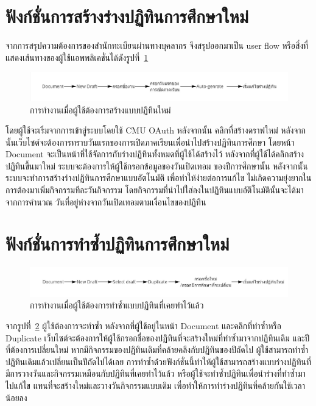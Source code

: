 
\section{ฟังก์ชั่นการสร้างร่างปฏิทินการศึกษาใหม่}
จากการสรุปความต้องการของสำนักทะเบียนผ่านทางบุคลากร จึงสรุปออกมาเป็น user flow หรือสิ่งที่แสดงเส้นทางของผู้ใช้แอพพลิเคชั่นได้ดังรูปที่~\ref{fig:user-flow-new}

%
\begin{figure}[h]
\centering
\includegraphics[width=1\textwidth]{pic3.1.jpg}
\caption{การทำงานเมื่อผู้ใช้ต้องการสร้างแบบปฏิทินใหม่}
\label{fig:user-flow-new}
\end{figure}
%
โดยผู้ใช้จะเริ่มจากการเข้าสู่ระบบโดยใช้ CMU OAuth หลังจากนั้น คลิกที่สร้างดราฟใหม่ 
หลังจากนั้นเว็บไซต์จะต้องการทราบวันแรกของการเปิดภาคเรียนเพื่อนำไปสร้างปฏิทินการศึกษา
โดยหน้า Document จะเป็นหน้าที่ใช้จัดการกับร่างปฏิทินทั้งหมดที่ผู้ใช้ได้สร้างไว้
หลังจากที่ผู้ใช้ได้คลิกสร้างปฏิทินขึ้นมาใหม่ ระบบจะต้องการให้ผู้ใช้กรอกข้อมูลของวันเปิดเทอม
ของปีการศึกษานั้น หลังจากนั้นระบบจะทำการสร้างร่างปฏิทินการศึกษาแบบอัตโนมัติ
เพื่อทำให้ง่ายต่อการแก้ไข ไม่เกิดความยุ่งยากในการต้องมาเพิ่มกิจกรรมทีละวันกิจกรรม
โดยกิจกรรมที่นำไปใส่ลงในปฏิทินแบบอัติโนมัตินั้นจะได้มาจากการคำนวณ
วันที่อยู่ห่างจากวันเปิดเทอมตามเงื่อนไขของปฏิทิน

\section{ฟังก์ชั่นการทำซ้ำปฏิทินการศึกษาใหม่}
\begin{figure}[h]
\centering
\includegraphics[width=1\textwidth]{pic3.2.jpg}
\caption{การทำงานเมื่อผู้ใช้ต้องการทำซ้ำแบบปฏิทินที่เคยทำไว้แล้ว}
\label{fig:user-flow-duplicate}
\end{figure}
จากรูปที่~\ref{fig:user-flow-duplicate} ผู้ใช้ต้องการจะทำซ้ำ หลังจากที่ผู้ใช้อยู่ในหน้า Document และคลิกที่ทำซ้ำหรือ Duplicate
เว็บไซต์จะต้องการให้ผู้ใช้กรอกชื่อของปฏิทินที่จะสร้างใหม่ที่ทำซ้ำมาจากปฏิทินเดิม
และปีที่ต้องการเปลี่ยนใหม่ หากมีกิจกรรมของปฏิทินเดิมที่คล้ายคลึงกับปฏิทินของปีถัดไป 
ผู้ใช้สามารถทำซ้ำปฏิทินเดิมแล้วเปลี่ยนเป็นปีถัดไปได้เลย 
การทำซ้ำด่้วยฟังก์ชั่นนี้ทำให้ผู้ใช้สามารถสร้างแบบร่างปฏิทินที่มีการวางวันและกิจกรรมเหมือนกับปฏิทินที่เคยทำไว้แล้ว
หรือผู้ใช้จะทำซ้ำปฏิทินเพื่อนำร่างที่ทำซ้ำมาไปแก้ไข แทนที่จะสร้างใหม่และวางวันกิจกรรมแบบเดิม เพื่อทำให้การทำร่างปฏิทินที่คล้ายกันใช้เวลาน้อยลง

